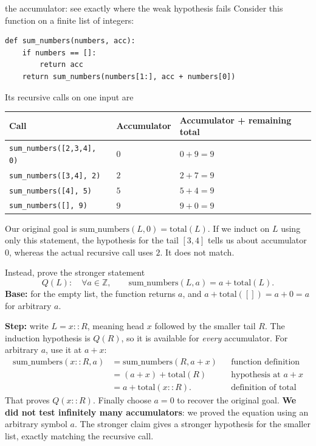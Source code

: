 \begin{example}{the accumulator: see exactly where the weak hypothesis fails}
Consider this function on a finite list of integers:
\begin{lstlisting}
def sum_numbers(numbers, acc):
    if numbers == []:
        return acc
    return sum_numbers(numbers[1:], acc + numbers[0])
\end{lstlisting}
Its recursive calls on one input are
\begin{center}
\begin{tabular}{@{}lll@{}}
\toprule
\textbf{Call} & \textbf{Accumulator} & \textbf{Accumulator + remaining total}\\
\midrule
\texttt{sum\_numbers([2,3,4], 0)} & $0$ & $0+9=9$\\
\texttt{sum\_numbers([3,4], 2)} & $2$ & $2+7=9$\\
\texttt{sum\_numbers([4], 5)} & $5$ & $5+4=9$\\
\texttt{sum\_numbers([], 9)} & $9$ & $9+0=9$\\
\bottomrule
\end{tabular}
\end{center}
Our original goal is $\mathrm{sum\_numbers}(L,0)=\mathrm{total}(L)$.
If we induct on $L$ using only this statement, the hypothesis for the tail $[3,4]$ tells us about accumulator $0$, whereas the actual recursive call uses $2$. It does not match.

Instead, prove the stronger statement
\[
Q(L):\quad\forall a\in\mathbb Z,\qquad
\mathrm{sum\_numbers}(L,a)=a+\mathrm{total}(L).
\]
\textbf{Base:} for the empty list, the function returns $a$, and $a+\mathrm{total}([])=a+0=a$ for arbitrary $a$.

\textbf{Step:} write $L=x::R$, meaning head $x$ followed by the smaller tail $R$. The induction hypothesis is $Q(R)$, so it is available for \emph{every} accumulator. For arbitrary $a$, use it at $a+x$:
\begin{align*}
\mathrm{sum\_numbers}(x::R,a)
 &=\mathrm{sum\_numbers}(R,a+x) &&\text{function definition}\\
 &=(a+x)+\mathrm{total}(R) &&\text{hypothesis at }a+x\\
 &=a+\mathrm{total}(x::R). &&\text{definition of total}
\end{align*}
That proves $Q(x::R)$. Finally choose $a=0$ to recover the original goal.
\textbf{We did not test infinitely many accumulators}: we proved the equation using an arbitrary symbol $a$. The stronger claim gives a stronger hypothesis for the smaller list, exactly matching the recursive call.
\end{example}

